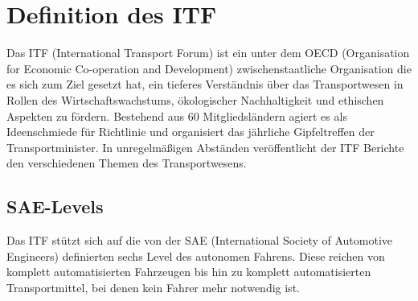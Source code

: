 \section{Definition des ITF}
\cite{websiteITF} Das ITF (International Transport Forum) ist ein unter dem OECD (Organisation for Economic Co-operation and Development) zwischenstaatliche Organisation die es sich zum Ziel gesetzt hat, ein tieferes Verständnis über das Transportwesen in Rollen des Wirtschaftswachstums, ökologischer Nachhaltigkeit und ethischen Aspekten zu fördern. Bestehend aus 60 Mitgliedsländern agiert es als Ideenschmiede für Richtlinie und organisiert das jährliche Gipfeltreffen der Transportminister. In unregelmäßigen Abständen veröffentlicht der ITF Berichte den verschiedenen Themen des Transportwesens.

\subsection{SAE-Levels}

\cite{standardSAE}\cite{smith2015automated} Das ITF stützt sich auf die von der SAE (International Society of Automotive Engineers) definierten sechs Level des autonomen Fahrens. Diese reichen von komplett automatisierten Fahrzeugen bis hin zu komplett automatisierten Transportmittel, bei denen kein Fahrer mehr notwendig ist.\\

